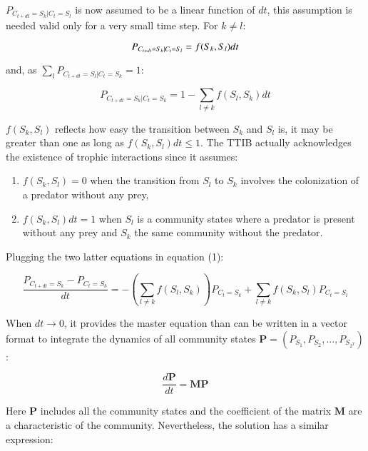 \(P_{C_{t+dt}=S_k|C_{t}=S_l}\) is now assumed to be a linear function
of \(dt\), this assumption is needed valid only for a very small time
step. For \(k \neq l\):

\begin{equation}
P_{C_{t+dt}=S_k|C_{t}=S_l} = f(S_k,S_l)dt \\
\end{equation}

and, as \(\sum_l P_{C_{t+dt}=S_l|C_{t}=S_k} = 1\):

\begin{equation}
P_{C_{t+dt}=S_k|C_{t}=S_k} = 1-\sum_{l \neq k}f(S_l,S_k)dt
\end{equation}

\(f(S_k,S_l)\) reflects how easy the transition between \(S_k\) and
\(S_l\) is, it may be greater than one as long as
\(f(S_k,S_l)dt\leqslant1\). The TTIB actually acknowledges the existence
of trophic interactions since it assumes:

\begin{enumerate}
\item
  \(f(S_k,S_l)=0\) when the transition from \(S_l\) to \(S_k\) involves
  the colonization of a predator without any prey,
\item
  \(f(S_k,S_l)dt=1\) when \(S_l\) is a community states where a predator
  is present without any prey and \(S_k\) the same community without the
  predator.
\end{enumerate}

Plugging the two latter equations in equation (1):

\begin{equation}
\frac{P_{C_{t+dt}=S_{k}}-P_{C_{t}=S_{k}}}{dt} = -\left(\sum_{l \neq k}f(S_l,S_k)\right)P_{C_{t}=S_{k}} + \sum_{l \neq k}f(S_k,S_l)P_{C_{t}=S_{l}}
\end{equation}

When \(dt \rightarrow 0\), it provides the master equation than can be
written in a vector format to integrate the dynamics of all community
states \(\mathbf{P}=(P_{S_1}, P_{S_2}, ..., P_{S_{2^T}})\):

\begin{equation}
\frac{d\mathbf{P}}{dt} = \mathbf{M}\mathbf{P}
\end{equation}

Here \(\mathbf{P}\) includes all the community states and the coefficient of the matrix
\(\mathbf{M}\) are a characteristic of the community. Nevertheless, the solution has a
similar expression:

